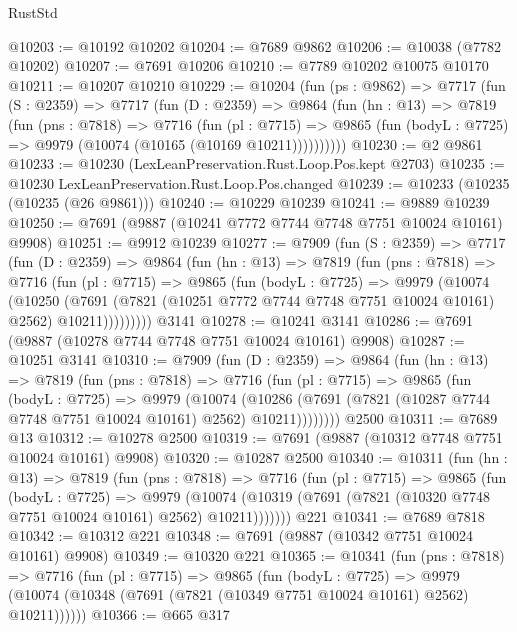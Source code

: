\begin{lexlean}{RustStd}
\begin{coremodule}
@10203 := @10192 @10202
@10204 := @7689 @9862
@10206 := @10038 (@7782 @10202)
@10207 := @7691 @10206
@10210 := @7789 @10202 @10075 @10170
@10211 := @10207 @10210
@10229 := @10204
    (fun (ps : @9862) =>
    @7717
      (fun (S : @2359) =>
      @7717
        (fun (D : @2359) =>
        @9864
          (fun (hn : @13) =>
          @7819
            (fun (pns : @7818) =>
            @7716
              (fun (pl : @7715) =>
              @9865 (fun (bodyL : @7725) => @9979 (@10074 (@10165 (@10169 @10211))))))))))
@10230 := @2 @9861
@10233 := @10230 (LexLeanPreservation.Rust.Loop.Pos.kept @2703)
@10235 := @10230 LexLeanPreservation.Rust.Loop.Pos.changed
@10239 := @10233 (@10235 (@10235 (@26 @9861)))
@10240 := @10229 @10239
@10241 := @9889 @10239
@10250 := @7691 (@9887 (@10241 @7772 @7744 @7748 @7751 @10024 @10161) @9908)
@10251 := @9912 @10239
@10277 := @7909
    (fun (S : @2359) =>
    @7717
      (fun (D : @2359) =>
      @9864
        (fun (hn : @13) =>
        @7819
          (fun (pns : @7818) =>
          @7716
            (fun (pl : @7715) =>
            @9865
              (fun (bodyL : @7725) =>
              @9979
                (@10074
                  (@10250
                    (@7691
                      (@7821 (@10251 @7772 @7744 @7748 @7751 @10024 @10161) @2562)
                      @10211)))))))))
    @3141
@10278 := @10241 @3141
@10286 := @7691 (@9887 (@10278 @7744 @7748 @7751 @10024 @10161) @9908)
@10287 := @10251 @3141
@10310 := @7909
    (fun (D : @2359) =>
    @9864
      (fun (hn : @13) =>
      @7819
        (fun (pns : @7818) =>
        @7716
          (fun (pl : @7715) =>
          @9865
            (fun (bodyL : @7725) =>
            @9979
              (@10074
                (@10286 (@7691 (@7821 (@10287 @7744 @7748 @7751 @10024 @10161) @2562) @10211))))))))
    @2500
@10311 := @7689 @13
@10312 := @10278 @2500
@10319 := @7691 (@9887 (@10312 @7748 @7751 @10024 @10161) @9908)
@10320 := @10287 @2500
@10340 := @10311
    (fun (hn : @13) =>
    @7819
      (fun (pns : @7818) =>
      @7716
        (fun (pl : @7715) =>
        @9865
          (fun (bodyL : @7725) =>
          @9979
            (@10074 (@10319 (@7691 (@7821 (@10320 @7748 @7751 @10024 @10161) @2562) @10211)))))))
    @221
@10341 := @7689 @7818
@10342 := @10312 @221
@10348 := @7691 (@9887 (@10342 @7751 @10024 @10161) @9908)
@10349 := @10320 @221
@10365 := @10341
    (fun (pns : @7818) =>
    @7716
      (fun (pl : @7715) =>
      @9865
        (fun (bodyL : @7725) =>
        @9979 (@10074 (@10348 (@7691 (@7821 (@10349 @7751 @10024 @10161) @2562) @10211))))))
@10366 := @665 @317

\end{coremodule}
\end{lexlean}
